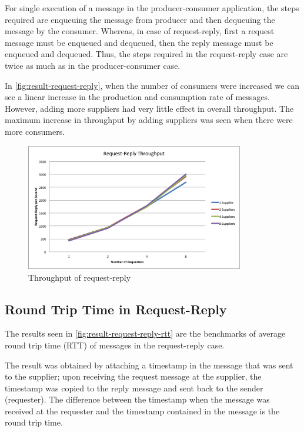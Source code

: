   For single execution of a message in the producer-consumer application, the steps required are enqueuing the message from producer and then dequeuing the message by the consumer. Whereas, in case of request-reply, first a request message must be enqueued and dequeued, then the reply message must be enqueued and dequeued. Thus, the steps required in the request-reply case are twice as much as in the producer-consumer case.

  In \autoref{fig:result-request-reply}, when the number of consumers were increased we can see a linear increase in the production and consumption rate of messages. However, adding more suppliers had very little effect in overall throughput. The maximum increase in throughput by adding suppliers was seen when there were more consumers.
\begin{figure}[H]
  \centering
  \includegraphics[width=0.85\textwidth]{figures/09request-reply}
  \caption[Throughput of request-reply]{Throughput of request-reply}
  \label{fig:result-request-reply}
\end{figure}

\subsection{Round Trip Time in Request-Reply}
\label{subsec:request-reply-rtt}
  The results seen in \autoref{fig:result-request-reply-rtt} are the benchmarks of average round trip time (RTT) of messages in the request-reply case.

  The result was obtained by attaching a timestamp in the message that was sent to the supplier; upon receiving the request message at the supplier, the timestamp was copied to the reply message and sent back to the sender (requester). The difference between the timestamp when the message was received at the requester and the timestamp contained in the message is the round trip time.

